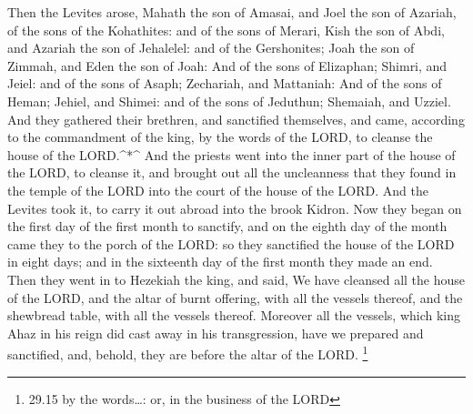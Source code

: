  Then the Levites arose, Mahath the son of Amasai, and Joel
the son of Azariah, of the sons of the Kohathites: and of the sons of
Merari, Kish the son of Abdi, and Azariah the son of Jehalelel: and of
the Gershonites; Joah the son of Zimmah, and Eden the son of Joah:
 And of the sons of Elizaphan; Shimri, and Jeiel: and of
the sons of Asaph; Zechariah, and Mattaniah:  And of the
sons of Heman; Jehiel, and Shimei: and of the sons of Jeduthun;
Shemaiah, and Uzziel.  And they gathered their brethren,
and sanctified themselves, and came, according to the commandment of the
king, by the words of the LORD, to cleanse the house of the
LORD.\^{}*\^{}  And the priests went into the inner part of
the house of the LORD, to cleanse it, and brought out all the
uncleanness that they found in the temple of the LORD into the court of
the house of the LORD. And the Levites took it, to carry it out abroad
into the brook Kidron.  Now they began on the first day of
the first month to sanctify, and on the eighth day of the month came
they to the porch of the LORD: so they sanctified the house of the LORD
in eight days; and in the sixteenth day of the first month they made an
end.  Then they went in to Hezekiah the king, and said, We
have cleansed all the house of the LORD, and the altar of burnt
offering, with all the vessels thereof, and the shewbread table, with
all the vessels thereof.  Moreover all the vessels, which
king Ahaz in his reign did cast away in his transgression, have we
prepared and sanctified, and, behold, they are before the altar of the
LORD. \footnote{29.15 by the words\ldots: or, in the business of the
  LORD}

